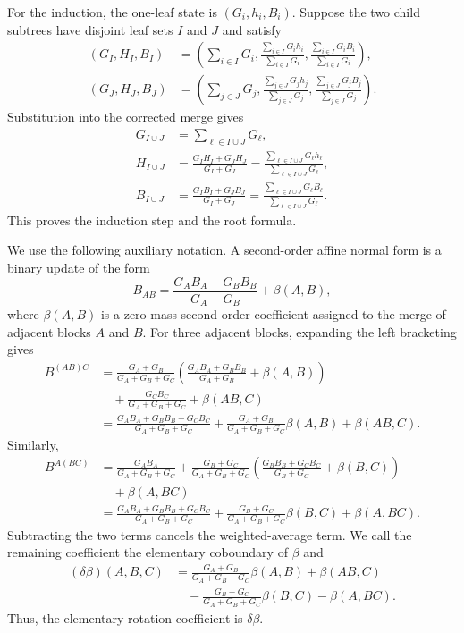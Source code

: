 \documentclass[11pt]{article}
\theoremstyle{plain}
\theoremstyle{definition}
\theoremstyle{definition}
\begin{document}
For the induction, the one-leaf state is $(G_i,h_i,B_i)$. Suppose the two child subtrees have disjoint leaf sets $I$ and $J$ and satisfy
\[
\begin{aligned}
(G_I,H_I,B_I)
&=\left(\sum_{i\in I}G_i,
\frac{\sum_{i\in I}G_ih_i}{\sum_{i\in I}G_i},
\frac{\sum_{i\in I}G_iB_i}{\sum_{i\in I}G_i}\right),\\
(G_J,H_J,B_J)
&=\left(\sum_{j\in J}G_j,
\frac{\sum_{j\in J}G_jh_j}{\sum_{j\in J}G_j},
\frac{\sum_{j\in J}G_jB_j}{\sum_{j\in J}G_j}\right).
\end{aligned}
\]
Substitution into the corrected merge gives
\[
\begin{aligned}
G_{I\cup J}&=\sum_{\ell\in I\cup J}G_\ell,\\
H_{I\cup J}
&=\frac{G_IH_I+G_JH_J}{G_I+G_J}
=\frac{\sum_{\ell\in I\cup J}G_\ell h_\ell}
       {\sum_{\ell\in I\cup J}G_\ell},\\
B_{I\cup J}
&=\frac{G_IB_I+G_JB_J}{G_I+G_J}
=\frac{\sum_{\ell\in I\cup J}G_\ell B_\ell}
       {\sum_{\ell\in I\cup J}G_\ell}.
\end{aligned}
\]
This proves the induction step and the root formula.


We use the following auxiliary notation. A second-order affine normal form is a binary update of the form
\[
B_{AB}=\frac{G_AB_A+G_BB_B}{G_A+G_B}+\beta(A,B),
\]
where $\beta(A,B)$ is a zero-mass second-order coefficient assigned to the merge of adjacent blocks $A$ and $B$. For three adjacent blocks, expanding the left bracketing gives
\[
\begin{aligned}
B^{(AB)C}
&=\frac{G_A+G_B}{G_A+G_B+G_C}\left(\frac{G_AB_A+G_BB_B}{G_A+G_B}+\beta(A,B)\right)\\
&\quad+\frac{G_CB_C}{G_A+G_B+G_C}+\beta(AB,C)\\
&=\frac{G_AB_A+G_BB_B+G_CB_C}{G_A+G_B+G_C}
+\frac{G_A+G_B}{G_A+G_B+G_C}\beta(A,B)+\beta(AB,C).
\end{aligned}
\]
Similarly,
\[
\begin{aligned}
B^{A(BC)}
&=\frac{G_AB_A}{G_A+G_B+G_C}
+\frac{G_B+G_C}{G_A+G_B+G_C}\left(\frac{G_BB_B+G_CB_C}{G_B+G_C}+\beta(B,C)\right)\\
&\quad+\beta(A,BC)\\
&=\frac{G_AB_A+G_BB_B+G_CB_C}{G_A+G_B+G_C}
+\frac{G_B+G_C}{G_A+G_B+G_C}\beta(B,C)+\beta(A,BC).
\end{aligned}
\]
Subtracting the two terms cancels the weighted-average term. We call the remaining coefficient the elementary coboundary of $\beta$ and 
\[
\begin{aligned}
(\delta\beta)(A,B,C)
&=\frac{G_A+G_B}{G_A+G_B+G_C}\beta(A,B)+\beta(AB,C)\\
&\quad -\frac{G_B+G_C}{G_A+G_B+G_C}\beta(B,C)-\beta(A,BC).
\end{aligned}
\]
Thus, the elementary rotation coefficient is $\delta\beta$.
\end{document}
